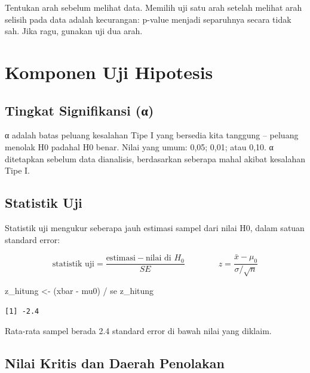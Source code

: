 \documentclass[
  indonesian,
  letterpaper,
]{book}
\newenvironment{Shaded}{\begin{snugshade}}{\end{snugshade}}
\newcommand{\NormalTok}[1]{\textcolor[rgb]{0.00,0.23,0.31}{#1}}
\newcommand{\OtherTok}[1]{\textcolor[rgb]{0.00,0.23,0.31}{#1}}
\newcommand{\SpecialCharTok}[1]{\textcolor[rgb]{0.37,0.37,0.37}{#1}}
\begin{document}
Tentukan arah sebelum melihat data. Memilih uji satu arah setelah
melihat arah selisih pada data adalah kecurangan: p-value menjadi
separuhnya secara tidak sah. Jika ragu, gunakan uji dua arah.

\section{Komponen Uji Hipotesis}\label{komponen-uji-hipotesis}

\subsection{Tingkat Signifikansi (α)}\label{tingkat-signifikansi-ux3b1}

α adalah batas peluang kesalahan Tipe I yang bersedia kita tanggung --
peluang menolak H0 padahal H0 benar. Nilai yang umum: 0,05; 0,01; atau
0,10. α ditetapkan sebelum data dianalisis, berdasarkan seberapa mahal
akibat kesalahan Tipe I.

\subsection{Statistik Uji}\label{statistik-uji}

Statistik uji mengukur seberapa jauh estimasi sampel dari nilai H0,
dalam satuan standard error:

\[\text{statistik uji} = \frac{\text{estimasi} - \text{nilai di } H_0}{SE} \qquad\qquad z = \frac{\bar{x} - \mu_0}{\sigma / \sqrt{n}}\]

\begin{Shaded}
\begin{Highlighting}[]
\NormalTok{z\_hitung }\OtherTok{\textless{}{-}}\NormalTok{ (xbar }\SpecialCharTok{{-}}\NormalTok{ mu0) }\SpecialCharTok{/}\NormalTok{ se}
\NormalTok{z\_hitung}
\end{Highlighting}
\end{Shaded}

\begin{verbatim}
[1] -2.4
\end{verbatim}

Rata-rata sampel berada 2.4 standard error di bawah nilai yang diklaim.

\subsection{Nilai Kritis dan Daerah
Penolakan}\label{nilai-kritis-dan-daerah-penolakan}
\end{document}
